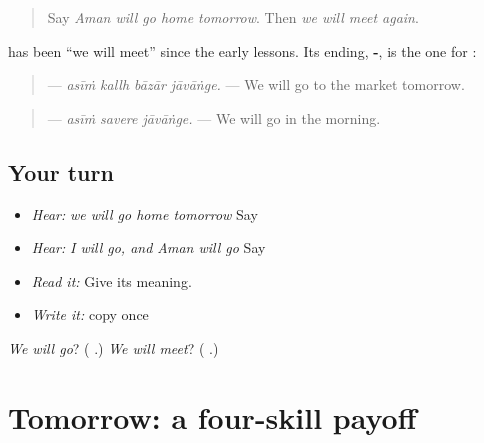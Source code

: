 \begin{quote}
Say \emph{Aman will go home tomorrow}. Then \emph{we will meet again}.
\end{quote}

\begin{grammarlens}[title={Grammar Lens: the ending of \pa{ਮਿਲਾਂਗੇ}}]
\textbf{} has been \textquotedblleft{}we will meet\textquotedblright{} since the early lessons. Its ending, \textbf{-}, is the one for \textbf{}:

\begin{quote}
\textbf{   } — \emph{asīṁ kallh bāzār jāvāṅge.} — We will go to the market tomorrow.
\end{quote}

\begin{quote}
\textbf{  } — \emph{asīṁ savere jāvāṅge.} — We will go in the morning.
\end{quote}
\end{grammarlens}

\subsection*{Your turn}
\begin{itemize}
\raggedright
  \item \emph{Hear:} \emph{we will go home tomorrow} Say \textbf{   }
  \item \emph{Hear:} \emph{I will go, and Aman will go} Say \textbf{    }
  \item \emph{Read it:} \textbf{  } Give its meaning.
  \item \emph{Write it:} copy \textbf{} once
\end{itemize}

\begin{tcolorbox}[breakable,colback=teal!4,colframe=teal!35!black,title={Before you move on}]
\emph{We will go}? (\textbf{ }.) \emph{We will meet}? (\textbf{ }.)
\end{tcolorbox}
\section[\texorpdfstring{\pa{ਮੈਂ} \pa{ਕੱਲ੍ਹ} \pa{ਸਕੂਲ} \pa{ਜਾਵਾਂਗਾ।} (maiṁ kallh sakūl …)}{ਮੈਂ ਕੱਲ੍ਹ ਸਕੂਲ ਜਾਵਾਂਗਾ। (maiṁ kallh sakūl …)}]{Tomorrow: a four-skill payoff}

